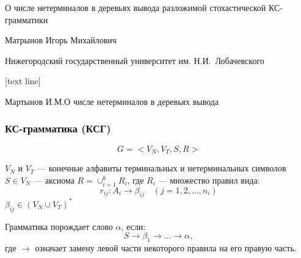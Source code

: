 \documentclass{beamer}
\begin{document}
	
	\begin{frame}
		\begin{center}
			{\LARGE О числе нетерминалов в деревьях вывода разложимой стохастической КС-грамматики }
		\end{center}
		
		\vfill
		
	
		\begin{center}
			{\Large Матрынов Игорь Михайлович}
			
			\vfill
			
			{\small Нижегородский государственный университет им. Н.И.~Лобачевского}
		\end{center}
	\end{frame}
	
	[text line]
	{
		\parbox{\linewidth}{\vspace*{-8pt} \color{gray} Мартынов И.М.\hfill О числе нетерминалов в деревьях вывода \hfill\insertpagenumber}
	}

	\begin{frame}
		\frametitle{КС-грамматика (КСГ)}
		$$
			G = <V_N, V_T, S, R>
		$$
		
		$V_N$ и $V_T$ --- конечные алфавиты терминальных и нетерминальных символов
		$S \in V_N$ --- аксиома
		$R = \cup_{i=1}^k R_i$, где $R_i$ --- множество правил вида:
		\begin{equation*}
		r_{ij} : A_i \rightarrow \beta_{ij}\quad (j = 1,2,\ldots,n_i)
		\end{equation*}
		$\beta_{ij} \in (V_N \cup V_T)^*$
		
		Грамматика порождает слово $\alpha$, если:
		$$
			S \rightarrow \beta_1 \rightarrow \ldots \rightarrow \alpha,
		$$
		где $\rightarrow$ означает замену левой части некоторого правила на его правую часть.
	\end{frame}
\end{document}
